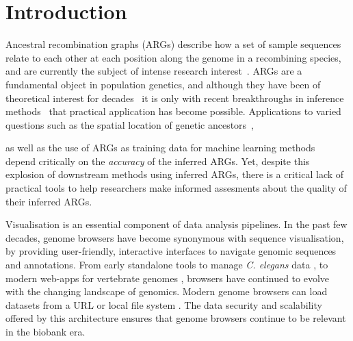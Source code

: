 \documentclass[unnumsec,webpdf,contemporary,large,namedate]{oup-authoring-template}%
\begin{document}
 \maketitle 

\section{Introduction} 
Ancestral recombination graphs (ARGs) describe how a set of sample
sequences relate to each other at each position along the genome in a recombining
species, and are currently the subject of intense research 
interest~\citep{brandt2024promise,lewanski2024era,nielsen2024inference,
wong2024general}. ARGs are a fundamental object in population genetics,
and although they have been of theoretical interest for
decades~\citep{Hudson1983,Griffiths1997} it is only with recent breakthroughs
in inference methods~\citep{rasmussen2014genome,
speidel2019method,kelleher2019inferring,wohns2022unified,zhang2023biobank,
gunnarsson2024scalable,deng2024robust} that practical application has 
become possible. Applications to varied questions such as the spatial 
location of genetic
ancestors~\citep{osmond2024estimating,deraje2024inferring,grundler2024geographic},

as well as the use of ARGs as training data for machine learning 
methods~\citep{whitehouse2024tree} depend critically on the \emph{accuracy}
of the inferred ARGs. Yet, despite this explosion of downstream methods using
inferred ARGs, there is a critical lack of practical tools to help
researchers make informed assesments about the quality of their inferred ARGs.


Visualisation
is an essential component of data analysis pipelines. In the past few decades,
genome browsers have become synonymous with sequence visualisation, by
providing user-friendly, interactive interfaces to navigate genomic sequences
and annotations. From early standalone tools to manage \textit{C. elegans} data
\citep{Eeckman1995}, to modern web-apps for vertebrate genomes
\citep{Birney2004,Rangwala2024,Nassar2023}, browsers have continued to evolve
with the changing landscape of genomics. Modern genome browsers can load
datasets from a URL or local file system \citep{IGV-web,Lee2013,Robinson2023}.
The data security and scalability offered by this architecture ensures that
genome browsers continue to be relevant in the biobank era.
\end{document}
